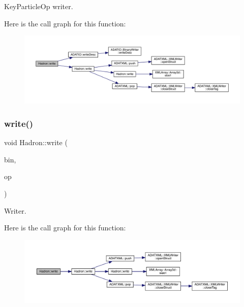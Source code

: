 Key\+Particle\+Op writer. 

Here is the call graph for this function\+:
\nopagebreak
\begin{figure}[H]
\begin{center}
\leavevmode
\includegraphics[width=350pt]{d1/daf/namespaceHadron_a4330be9331eb4c839e7e123f5306560b_cgraph}
\end{center}
\end{figure}
\mbox{\label{namespaceHadron_a780fbaaa0f7e3ba3453b4994b3ecd7d0}} 
\subsubsection{\texorpdfstring{write()}{write()}\hspace{0.1cm}{\footnotesize\ttfamily [45/95]}}
{\footnotesize\ttfamily void Hadron\+::write (\begin{DoxyParamCaption}\item[{\mbox{\hyperlink{classADATIO_1_1BinaryWriter}{Binary\+Writer}} \&}]{bin,  }\item[{const \mbox{\hyperlink{structHadron_1_1KeySingleHadronQuarkSpin__t}{Key\+Single\+Hadron\+Quark\+Spin\+\_\+t}} \&}]{op }\end{DoxyParamCaption})}



Writer. 

Here is the call graph for this function\+:
\nopagebreak
\begin{figure}[H]
\begin{center}
\leavevmode
\includegraphics[width=350pt]{d1/daf/namespaceHadron_a780fbaaa0f7e3ba3453b4994b3ecd7d0_cgraph}
\end{center}
\end{figure}
\mbox{\label{namespaceHadron_a91e2c5264aeab6dfb2be779cf7140626}} 
